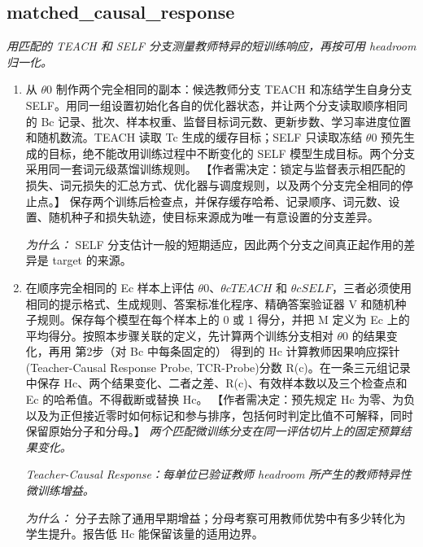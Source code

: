 \documentclass[10pt,a4paper]{article}
\begin{document}
\subsection*{matched\_causal\_response}
\emph{用匹配的 TEACH 和 SELF 分支测量教师特异的短训练响应，再按可用 headroom 归一化。}
\begin{enumerate}[leftmargin=*,start=3]
  \item 从 \(\theta 0\) 制作两个完全相同的副本：候选教师分支 TEACH 和冻结学生自身分支 SELF。用同一组设置初始化各自的优化器状态，并让两个分支读取顺序相同的 Bc 记录、批次、样本权重、监督目标词元数、更新步数、学习率进度位置和随机数流。TEACH 读取 Tc 生成的缓存目标；SELF 只读取冻结 \(\theta 0\) 预先生成的目标，绝不能改用训练过程中不断变化的 SELF 模型生成目标。两个分支采用同一套词元级蒸馏训练规则。 【作者需决定：锁定与监督表示相匹配的损失、词元损失的汇总方式、优化器与调度规则，以及两个分支完全相同的停止点。】 保存两个训练后检查点，并保存缓存哈希、记录顺序、词元数、设置、随机种子和损失轨迹，使目标来源成为唯一有意设置的分支差异。
\par\emph{为什么：} SELF 分支估计一般的短期适应，因此两个分支之间真正起作用的差异是 target 的来源。
  \item 在顺序完全相同的 Ec 样本上评估 \(\theta 0\)、\(\theta cTEACH\) 和 \(\theta cSELF\)，三者必须使用相同的提示格式、生成规则、答案标准化程序、精确答案验证器 V 和随机种子规则。保存每个模型在每个样本上的 0 或 1 得分，并把 M 定义为 Ec 上的平均得分。按照本步骤关联的定义，先计算两个训练分支相对 \(\theta 0\) 的结果变化，再用 第2步（对 Bc 中每条固定的） 得到的 Hc 计算教师因果响应探针(Teacher-Causal Response Probe, TCR-Probe)分数 R(c)。在一条三元组记录中保存 Hc、两个结果变化、二者之差、R(c)、有效样本数以及三个检查点和 Ec 的哈希值。不得截断或替换 Hc。 【作者需决定：预先规定 Hc 为零、为负以及为正但接近零时如何标记和参与排序，包括何时判定比值不可解释，同时保留原始分子和分母。】
\noindent\emph{两个匹配微训练分支在同一评估切片上的固定预算结果变化。}
\par{}
\noindent\emph{Teacher-Causal Response：每单位已验证教师 headroom 所产生的教师特异性微训练增益。}
\par{}
\par\emph{为什么：} 分子去除了通用早期增益；分母考察可用教师优势中有多少转化为学生提升。报告低 Hc 能保留该量的适用边界。
\end{enumerate}
\end{document}
